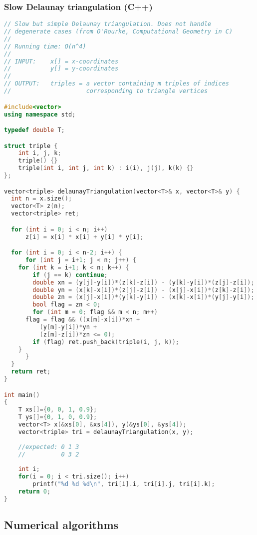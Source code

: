 \subsubsection{Slow Delaunay triangulation (C++)}
\begin{lstlisting}[language=C++]
// Slow but simple Delaunay triangulation. Does not handle
// degenerate cases (from O'Rourke, Computational Geometry in C)
//
// Running time: O(n^4)
//
// INPUT:    x[] = x-coordinates
//           y[] = y-coordinates
//
// OUTPUT:   triples = a vector containing m triples of indices
//                     corresponding to triangle vertices

#include<vector>
using namespace std;

typedef double T;

struct triple {
    int i, j, k;
    triple() {}
    triple(int i, int j, int k) : i(i), j(j), k(k) {}
};

vector<triple> delaunayTriangulation(vector<T>& x, vector<T>& y) {
  int n = x.size();
  vector<T> z(n);
  vector<triple> ret;

  for (int i = 0; i < n; i++)
      z[i] = x[i] * x[i] + y[i] * y[i];

  for (int i = 0; i < n-2; i++) {
      for (int j = i+1; j < n; j++) {
    for (int k = i+1; k < n; k++) {
        if (j == k) continue;
        double xn = (y[j]-y[i])*(z[k]-z[i]) - (y[k]-y[i])*(z[j]-z[i]);
        double yn = (x[k]-x[i])*(z[j]-z[i]) - (x[j]-x[i])*(z[k]-z[i]);
        double zn = (x[j]-x[i])*(y[k]-y[i]) - (x[k]-x[i])*(y[j]-y[i]);
        bool flag = zn < 0;
        for (int m = 0; flag && m < n; m++)
      flag = flag && ((x[m]-x[i])*xn + 
          (y[m]-y[i])*yn + 
          (z[m]-z[i])*zn <= 0);
        if (flag) ret.push_back(triple(i, j, k));
    }
      }
  }
  return ret;
}

int main()
{
    T xs[]={0, 0, 1, 0.9};
    T ys[]={0, 1, 0, 0.9};
    vector<T> x(&xs[0], &xs[4]), y(&ys[0], &ys[4]);
    vector<triple> tri = delaunayTriangulation(x, y);
    
    //expected: 0 1 3
    //          0 3 2
    
    int i;
    for(i = 0; i < tri.size(); i++)
        printf("%d %d %d\n", tri[i].i, tri[i].j, tri[i].k);
    return 0;
}

\end{lstlisting}
\subsection{Numerical algorithms}
